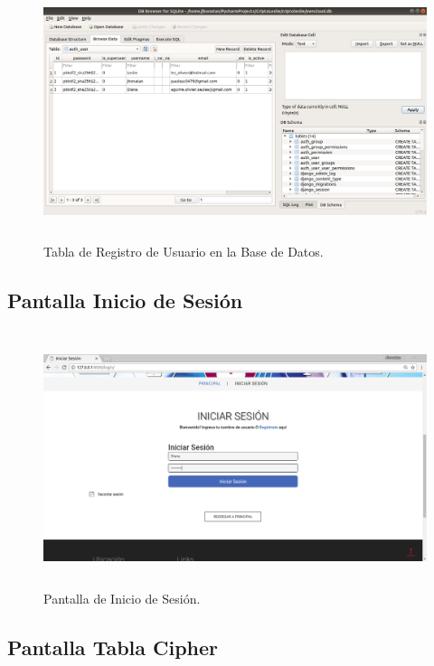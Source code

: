 			\begin{figure}[H]
			\centering
			\includegraphics[width=14cm, height=7.5cm]{./images/Implementacion/BDTablaRegistroUsuario.png}
			\caption{Tabla de Registro de Usuario en la Base de Datos.}
			\label{fig:6-1-5} 
			\end{figure}

\subsection{Pantalla Inicio de Sesión}

			\begin{figure}[H]
			\centering
			\includegraphics[width=14cm, height=7.5cm]{./images/Implementacion/PantallaIniciarSesion.png}
			\caption{Pantalla de Inicio de Sesión.}
			\label{fig:6-1-6} 
			\end{figure}

\subsection{Pantalla Tabla Cipher}

